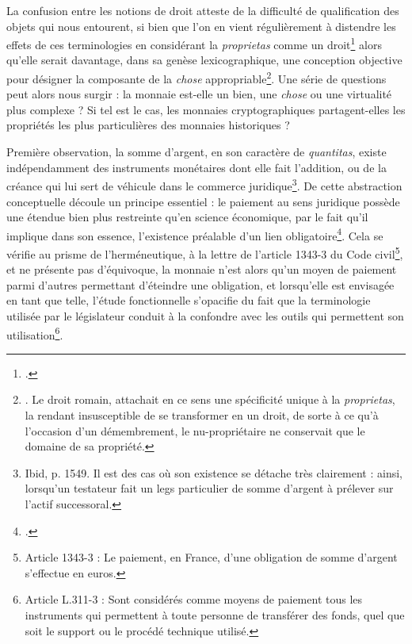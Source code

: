 {La confusion entre les notions de droit atteste de la difficulté de qualification des objets qui nous entourent, si bien que l'on en vient régulièrement à distendre les effets de ces terminologies en considérant la \emph{proprietas} comme un droit\footnote{.} alors qu'elle serait davantage, dans sa genèse lexicographique, une conception objective pour désigner la composante de la \emph{chose} appropriable\footnote{. Le droit romain, attachait en ce sens une spécificité unique à la \emph{proprietas}, la rendant insusceptible de se transformer en un droit, de sorte à ce qu'à l'occasion d'un démembrement, le nu-propriétaire ne conservait que le domaine de sa propriété.}. Une série de questions peut alors nous surgir : la monnaie est-elle un bien, une \emph{chose} ou une virtualité plus complexe ? Si tel est le cas, les monnaies cryptographiques partagent-elles les propriétés les plus particulières des monnaies historiques ?\par

Première observation, la somme d'argent, en son caractère de \emph{quantitas}, existe indépendamment des instruments monétaires dont elle fait l'addition, ou de la créance qui lui sert de véhicule dans le commerce juridique\footnote{Ibid, p. 1549. \og Il est des cas où son existence se détache très clairement : ainsi, lorsqu'un testateur fait un legs particulier de somme d'argent à prélever sur l'actif successoral\fg{}.}. De cette abstraction conceptuelle découle un principe essentiel : le paiement au sens juridique possède une étendue bien plus restreinte qu'en science économique, par le fait qu'il implique dans son essence, l'existence préalable d'un lien obligatoire\footnote{.}. Cela se vérifie au prisme de l'herméneutique, à la lettre de l'article 1343-3 du Code civil\footnote{Article 1343-3 : \og Le paiement, en France, d'une obligation de somme d'argent s'effectue en euros\fg{}.}, et ne présente pas d'équivoque, la monnaie n'est alors qu'un moyen de paiement parmi d'autres permettant d'éteindre une obligation, et lorsqu'elle est envisagée en tant que telle, l'étude fonctionnelle s'opacifie du fait que la terminologie utilisée par le législateur conduit à la confondre avec les outils qui permettent son utilisation\footnote{Article L.311-3 : \og Sont considérés comme moyens de paiement tous les instruments qui permettent à toute personne de transférer des fonds, quel que soit le support ou le procédé technique utilisé\fg{}.}.\par

}
